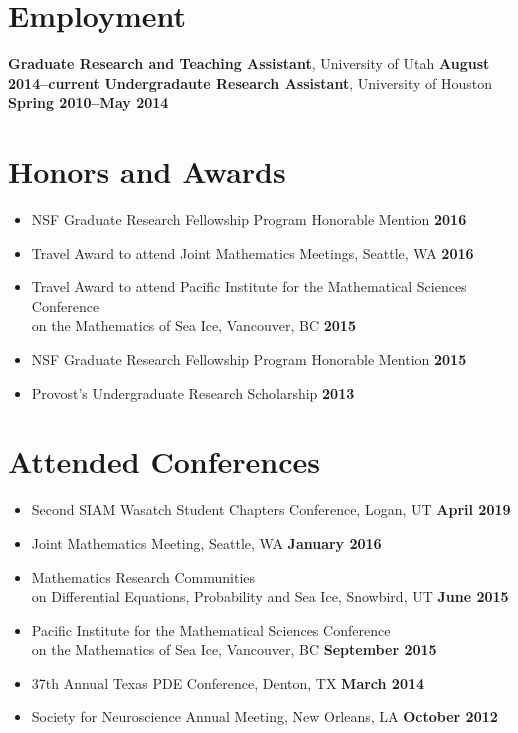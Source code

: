 \documentclass[margin,line]{res}
\begin{document}
\begin{resume}
\section{\sc Employment}
{\bf Graduate Research and Teaching Assistant}, University of Utah \hfill {\bf August 2014--current}
{\bf Undergradaute Research Assistant}, University of Houston \hfill {\bf Spring 2010--May 2014}

\section{\sc Honors and Awards}
\begin{itemize}
    \item[] NSF Graduate Research Fellowship Program Honorable Mention \hfill {\bf 2016}
    \item[] Travel Award to attend Joint Mathematics Meetings, Seattle, WA \hfill {\bf 2016}
    \item[] Travel Award to attend Pacific Institute for the Mathematical Sciences Conference\\ on the Mathematics of Sea Ice, Vancouver, BC \hfill {\bf 2015}
    \item[] NSF Graduate Research Fellowship Program Honorable Mention \hfill {\bf 2015}
    \item[] Provost's Undergraduate Research Scholarship \hfill {\bf 2013}
\end{itemize}
\ifx\nopubs\undefined

\else
\fi

\section{\sc Attended Conferences}
\begin{itemize}
\item[] Second SIAM Wasatch Student Chapters Conference, Logan, UT
\hfill {\bf April 2019}
\item[] Joint Mathematics Meeting, Seattle, WA
\hfill {\bf January 2016}
\item[] Mathematics Research Communities \\ on Differential Equations, Probability and Sea Ice, Snowbird, UT
 \hfill {\bf June 2015}
\item[] Pacific Institute for the Mathematical Sciences Conference \\ on the Mathematics of Sea Ice, Vancouver, BC
  \hfill {\bf September 2015}
\item[] 37th Annual Texas PDE Conference, Denton, TX
\hfill {\bf March 2014}
\item[] Society for Neuroscience Annual Meeting, New Orleans, LA
\hfill {\bf October 2012}
\end{itemize}


\end{resume}
\end{document}
